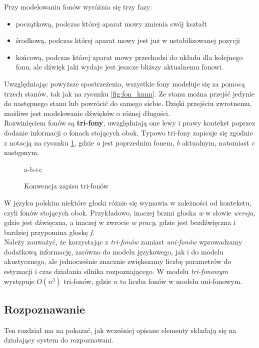 \documentclass[11pt]{article}
\begin{document}
		Przy modelowaniu fonów wyróżnia się trzy fazy:
		\begin{itemize}
			\item początkową, podczas której aparat mowy zmienia swój kształt
			\item środkową, podczas której aparat mowy jest już w ustabilizowanej pozycji
			\item końcową, podczas której aparat mowy przechodzi do układu dla kolejnego fonu, ale dźwięk jaki wydaje jest jeszcze bliższy aktualnemu fonowi. 
		\end{itemize}
		Uwzględniając powyższe spostrzeżenia, wszystkie fony modeluje się za pomocą trzech stanów, tak jak na rysunku \ref{fig:fon_hmm}. Ze stanu można przejść jedynie do następnego stanu lub powrócić do samego siebie. Dzięki przejściu zwrotnemu, możliwe jest modelowanie dźwięków o różnej długości. 
		\\
		Rozwinięciem fonów są \textbf{tri-fony}, uwzględniają one lewy i prawy kontekst poprzez dodanie informacji o fonach stojących obok. Typowo tri-fony zapisuje się zgodnie z notacją na rysunku \ref{fig:tri-fony_notacja}, gdzie \textit{a} jest poprzednim fonem, \textit{b} aktualnym, natomiast \textit{c} następnym. 
		
		\begin{figure}[H]
			\begin{center}
			{a-b+c}
			\end{center}
			\caption{Konwencja zapisu tri-fonów}
			\label{fig:tri-fony_notacja}
		\end{figure}
	
		W języku polskim niektóre głoski różnie się wymawia w zależności od kontekstu, czyli fonów stojących obok. Przykładowo, inaczej brzmi głoska \textit{w} w słowie \textit{wersja}, gdzie jest dźwięczna, a inaczej w zwrocie \textit{w pracy}, gdzie jest bezdźwięczna i bardziej przypomina głoskę \textit{f}.
		\\
		Należy zauważyć, że korzystając z \textit{tri-fonów} zamiast \textit{uni-fonów} wprowadzamy dodatkową informację, zarówno do modelu językowego, jak i do modelu akustycznego, ale jednocześnie znacznie zwiększamy liczbę parametrów do estymacji i czas działania silnika rozpoznającego. W modelu \textit{tri-fonowym} występuje $O(n^3)$ tri-fonów, gdzie $n$ to liczba fonów w modelu uni-fonowym.  
		
	\subsection{ Rozpoznawanie }
		Ten rozdział ma na pokazać, jak wcześniej opisane elementy składają się na działający system do rozpoznawani.
\end{document}
